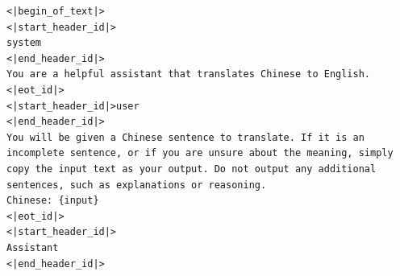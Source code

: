 \begin{listing}[H]
\begin{verbatim}
<|begin_of_text|>
<|start_header_id|>
system
<|end_header_id|>
You are a helpful assistant that translates Chinese to English.
<|eot_id|>
<|start_header_id|>user
<|end_header_id|>
You will be given a Chinese sentence to translate. If it is an incomplete sentence, or if you are unsure about the meaning, simply copy the input text as your output. Do not output any additional sentences, such as explanations or reasoning.
Chinese: {input}
<|eot_id|>
<|start_header_id|>
Assistant
<|end_header_id|>
\end{verbatim}
\caption{Machine Translation - Chat Template (\mttem) for Llama-3 models. The placeholder \textit{\{input\}} will be filled with the Chinese sentence retrieved from the \mac testing set.}
\label{list:mt-chat}
\end{listing}
